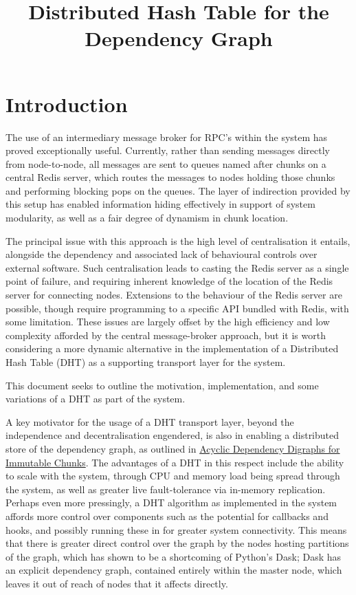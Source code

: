 \documentclass[10pt, a4paper]{article}
\begin{document}
\title{Distributed Hash Table for the Dependency Graph}
  
\maketitle

\section{Introduction}

The use of an intermediary message broker for RPC's within the system has proved exceptionally useful.
Currently, rather than sending messages directly from node-to-node, all messages are sent to queues named after chunks on a central Redis server, which routes the messages to nodes holding those chunks and performing blocking pops on the queues.
The layer of indirection provided by this setup has enabled information hiding effectively in support of system modularity, as well as a fair degree of dynamism in chunk location.

The principal issue with this approach is the high level of centralisation it entails, alongside the dependency and associated lack of behavioural controls over external software.
Such centralisation leads to casting the Redis server as a single point of failure, and requiring inherent knowledge of the location of the Redis server for connecting nodes.
Extensions to the behaviour of the Redis server are possible, though require programming to a specific API bundled with Redis, with some limitation.
These issues are largely offset by the high efficiency and low complexity afforded by the central message-broker approach, but it is worth considering a more dynamic alternative in the implementation of a Distributed Hash Table (DHT) as a supporting transport layer for the system.

This document seeks to outline the motivation, implementation, and some variations of a DHT as part of the \lsr{} system.

A key motivator for the usage of a DHT transport layer, beyond the independence and decentralisation engendered, is also in enabling a distributed store of the dependency graph, as outlined in \href{https://www.japeca.com/depdag.pdf}{Acyclic Dependency Digraphs for Immutable Chunks}.
The advantages of a DHT in this respect include the ability to scale with the system, through CPU and memory load being spread through the system, as well as greater live fault-tolerance via in-memory replication.
Perhaps even more pressingly, a DHT algorithm as implemented in the system affords more control over components such as the potential for callbacks and hooks, and possibly running these in \R{} for greater system connectivity.
This means that there is greater direct control over the graph by the nodes hosting partitions of the graph, which has shown to be a shortcoming of Python's Dask; Dask has an explicit dependency graph, contained entirely within the master node, which leaves it out of reach of nodes that it affects directly.
\end{document}
